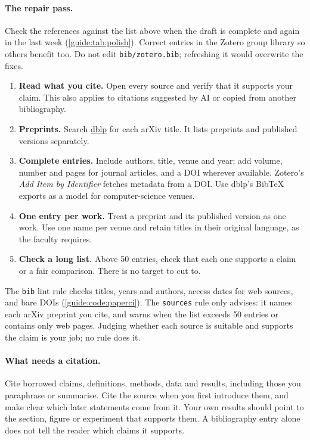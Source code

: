 \paragraph{The repair pass.} Check the references against the list above when the draft is complete and again in the last week (\cref{guide:tab:polish}). Correct entries in the Zotero group library so others benefit too. Do not edit \texttt{bib/zotero.bib}; refreshing it would overwrite the fixes.
\begin{enumerate}
  \item \textbf{Read what you cite.} Open every source and verify that it supports your claim. This also applies to citations suggested by AI or copied from another bibliography.
  \item \textbf{Preprints.} Search \href{https://dblp.org/}{dblp} for each arXiv title. It lists preprints and published versions separately.
  \item \textbf{Complete entries.} Include authors, title, venue and year; add volume, number and pages for journal articles, and a DOI wherever available. Zotero's \emph{Add Item by Identifier} fetches metadata from a DOI. Use dblp's BibTeX exports as a model for computer-science venues.
  \item \textbf{One entry per work.} Treat a preprint and its published version as one work. Use one name per venue and retain titles in their original language, as the faculty requires.
  \item \textbf{Check a long list.} Above 50 entries, check that each one supports a claim or a fair comparison. There is no target to cut to.
\end{enumerate}
The \texttt{bib} lint rule checks titles, years and authors, access dates for web sources, and bare DOIs (\cref{guide:code:paperci}). The \texttt{sources} rule only advises: it names each arXiv preprint you cite, and warns when the list exceeds 50 entries or contains only web pages. Judging whether each source is suitable and supports the claim is your job; no rule does it.

\paragraph{What needs a citation.}\label{guide:writing:citation-placement}
Cite borrowed claims, definitions, methods, data and results, including those you paraphrase or summarise. Cite the source when you first introduce them, and make clear which later statements come from it. Your own results should point to the section, figure or experiment that supports them. A bibliography entry alone does not tell the reader which claims it supports.


